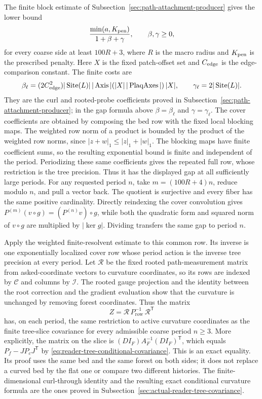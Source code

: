 The finite block estimate of Subsection~\ref{sec:path-attachment-producer} gives the
lower bound
\[
 \frac{\min(a,K_{\rm pen})}{1+\beta+\gamma},
 \qquad \beta,\gamma\ge0,
\]
for every coarse side at least $100R+3$, where $R$ is the macro radius
and $K_{\rm pen}$ is the prescribed penalty. Here $X$ is the fixed
patch-offset set and $C_{\rm edge}$ is the edge-comparison constant. The
finite costs are
\[
 \beta_\ell=(2C_{\rm edge}^2)|\operatorname{Site}(L)|\,|\operatorname{Axis}|
 (|X|\,|\operatorname{PlaqAxes}|)\,|X|,
 \qquad \gamma_\ell=2|\operatorname{Site}(L)|.
\]
They are the curl and rooted-probe coefficients proved in
Subsection~\ref{sec:path-attachment-producer}; in the gap formula above
$\beta=\beta_\ell$ and $\gamma=\gamma_\ell$.
The cover coefficients are obtained by composing the bed row with the
fixed local blocking maps. The weighted row norm of a product is bounded
by the product of the weighted row norms, since
$|z+w|_1\le |z|_1+|w|_1$. The blocking maps have finite coefficient sums,
so the resulting exponential bound is finite and independent of the
period. Periodizing these same coefficients gives the repeated full row,
whose restriction is the tree precision. Thus it has the displayed gap
at all sufficiently large periods. For any requested period $n$, take
$m=(100R+4)n$, reduce modulo $n$, and pull a vector back. The quotient is
surjective and every fiber has the same positive cardinality. Directly
reindexing the cover convolution gives
$P^{(m)}(v\circ g)=(P^{(n)}v)\circ g$, while both the quadratic form
and squared norm of $v\circ g$ are multiplied by $|\ker g|$. Dividing
transfers the same gap to period $n$.

Apply the weighted finite-resolvent estimate to this common row. Its
inverse is one exponentially localized cover row whose period action is
the inverse tree precision at every period. Let $\mathcal R$ be the fixed
rooted path-measurement matrix from asked-coordinate vectors to curvature
coordinates, so its rows are indexed by $\mathcal C$ and columns by
$\mathcal I$. The rooted gauge projection
and the identity between the root correction and the gradient evaluation
show that the curvature is unchanged by removing forest coordinates.
Thus the matrix
\[
             Z=\mathcal R\,P^{-1}_{\mathrm{row}}\,\mathcal R^{\mathsf T}
\]
has, on each period, the same restriction to active curvature coordinates
as the finite tree-slice covariance for every admissible coarse period
$n\ge3$. More explicitly, the matrix on the
slice is $(DI_F)A_F^{-1}(DI_F)^{\mathsf T}$, which equals
$P_f-JP_cJ^{\mathsf T}$ by \eqref{eq:reader-tree-conditional-covariance}.
This is an exact equality. Its proof
uses the same bed and the same forest on both sides; it does not replace a
curved bed by the flat one or compare two different histories. The
finite-dimensional curl-through identity and the resulting exact
conditional curvature formula are the ones proved in
Subsection~\ref{sec:actual-reader-tree-covariance}.

